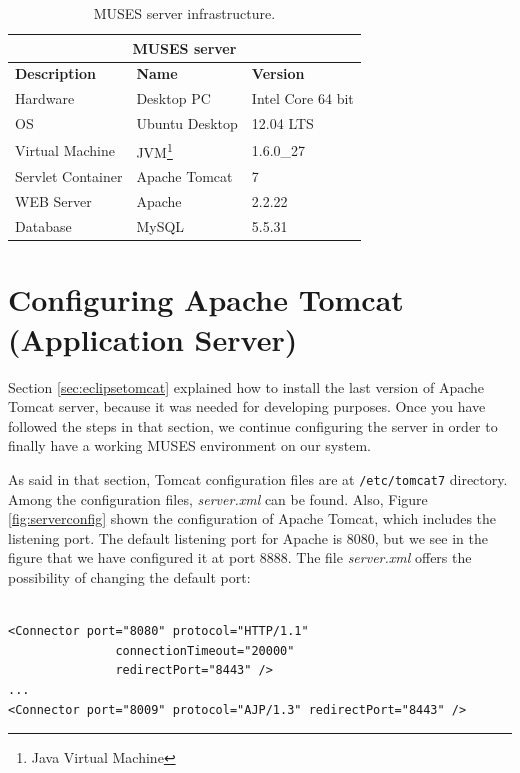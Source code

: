 \begin{table}[!htbp]
  \caption{MUSES server infrastructure.}
  \label{tab:server_infrastructure}

  \begin{center}
    \begin{tabular}{ |l|l|l| }
    \hline
    \multicolumn{3}{|c|}{\textbf{MUSES server}} \\
    \hline
    \textbf{Description} & \textbf{Name} & \textbf{Version} \\
    \hline
    Hardware & Desktop PC & Intel Core 64 bit \\
    OS & Ubuntu Desktop & 12.04 LTS \\
    Virtual Machine & JVM\footnote{Java Virtual Machine} & 1.6.0\_27 \\
    Servlet Container & Apache Tomcat & 7 \\
    WEB Server & Apache & 2.2.22 \\
    Database & MySQL & 5.5.31 \\
    \hline
    \end{tabular}
  \end{center}
\end{table}

\section{Configuring Apache Tomcat (Application Server)}
\label{sec:tomcat}

Section \ref{sec:eclipsetomcat} explained how to install the last version of Apache Tomcat server, because it was needed for developing purposes. Once you have followed the steps in that section, we continue configuring the server in order to finally have a working MUSES environment on our system.

As said in that section, Tomcat configuration files are at \texttt{/etc/tomcat7} directory. Among the configuration files, \textit{server.xml} can be found. Also, Figure \ref{fig:serverconfig} shown the configuration of Apache Tomcat, which includes the listening port. The default listening port for Apache is 8080, but we see in the figure that we have configured it at port 8888. The file \textit{server.xml} offers the possibility of changing the default port:
\\
\\
\begin{verbatim}
<Connector port="8080" protocol="HTTP/1.1" 
               connectionTimeout="20000" 
               redirectPort="8443" />
...
<Connector port="8009" protocol="AJP/1.3" redirectPort="8443" />
\end{verbatim}

